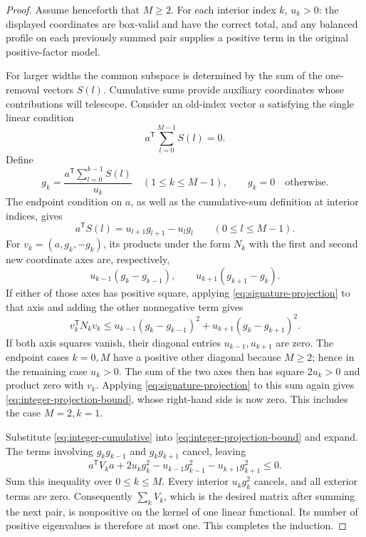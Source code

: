 \begin{proof}
Assume henceforth that $M\ge2$.
For each interior index \(k\), \(u_k>0\):
the displayed coordinates are box-valid and have the correct total,
and any balanced profile on each previously summed pair supplies
a positive term in the original positive-factor model.

For larger widths the common subspace is determined by the sum of
the one-removal vectors $S(l)$.  Cumulative sums provide auxiliary
coordinates whose contributions will telescope.  Consider an
old-index vector \(a\) satisfying the single linear condition
\[
 a^{\mathsf T}\sum_{l=0}^{M-1}S(l)=0.
\]
Define
\[
 g_k=
 \frac{a^{\mathsf T}\sum_{l=0}^{k-1}S(l)}{u_k}
 \quad(1\le k\le M-1),
 \qquad
 g_k=0\quad\text{otherwise}.
\]
The endpoint condition on \(a\), as well as the cumulative-sum
definition at interior indices, gives
\begin{equation}
 a^{\mathsf T}S(l)=u_{l+1}g_{l+1}-u_lg_l
 \qquad(0\le l\le M-1).
 \label{eq:integer-cumulative}
\end{equation}
For \(v_k=(a,g_k,-g_k)\), its products under the form \(N_k\) with
the first and second new coordinate axes are, respectively,
\[
 u_{k-1}(g_k-g_{k-1}),
 \qquad
 u_{k+1}(g_{k+1}-g_k).
\]
If either of those axes has positive square, applying
\eqref{eq:signature-projection} to that axis and adding the other
nonnegative term gives
\begin{equation}
 v_k^{\mathsf T}N_kv_k
 \le
 u_{k-1}(g_k-g_{k-1})^2+
 u_{k+1}(g_k-g_{k+1})^2.
 \label{eq:integer-projection-bound}
\end{equation}
If both axis squares vanish, their diagonal entries
\(u_{k-1},u_{k+1}\) are zero.
The endpoint cases \(k=0,M\) have a positive other diagonal because
\(M\ge2\); hence in the remaining case \(u_k>0\).
The sum of the two axes then has square \(2u_k>0\) and product zero
with \(v_k\).
Applying \eqref{eq:signature-projection} to this sum again gives
\eqref{eq:integer-projection-bound}, whose right-hand side is now
zero.
This includes the case \(M=2,k=1\).

Substitute \eqref{eq:integer-cumulative} into
\eqref{eq:integer-projection-bound} and expand.  The terms involving
$g_kg_{k-1}$ and $g_kg_{k+1}$ cancel, leaving
\begin{equation}
 a^{\mathsf T}V_ka
 +2u_kg_k^2
 -u_{k-1}g_{k-1}^2
 -u_{k+1}g_{k+1}^2
 \le0.
 \label{eq:integer-telescoping}
\end{equation}
Sum this inequality over \(0\le k\le M\).
Every interior \(u_kg_k^2\) cancels, and all exterior terms are zero.
Consequently \(\sum_kV_k\), which is the desired matrix after summing
the next pair, is nonpositive on the kernel of one linear functional.
Its number of positive eigenvalues is therefore at most one.
This completes the induction.


\end{proof}
